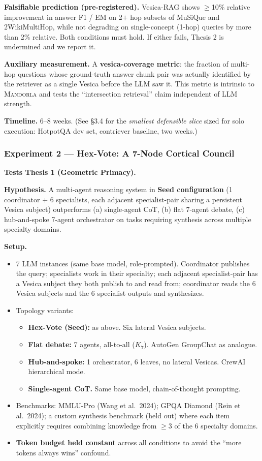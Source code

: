 \documentclass[11pt,a4paper]{article}
\begin{document}
\textbf{Falsifiable prediction (pre-registered).} Vesica-RAG shows $\geq$10\% relative improvement in answer F1 / EM on 2$+$ hop subsets of MuSiQue and 2WikiMultiHop, while not degrading on single-concept (1-hop) queries by more than 2\% relative. Both conditions must hold. If either fails, Thesis 2 is undermined and we report it.

\textbf{Auxiliary measurement.} A \textbf{vesica-coverage metric}: the fraction of multi-hop questions whose ground-truth answer chunk pair was actually identified by the retriever as a single Vesica before the LLM saw it. This metric is intrinsic to \textsc{Mandorla} and tests the ``intersection retrieval'' claim independent of LLM strength.

\textbf{Timeline.} 6--8 weeks. (See \S 3.4 for the \emph{smallest defensible slice} sized for solo execution: HotpotQA dev set, contriever baseline, two weeks.)

\subsubsection*{Experiment 2 --- Hex-Vote: A 7-Node Cortical Council}

\textbf{Tests Thesis 1 (Geometric Primacy).}

\textbf{Hypothesis.} A multi-agent reasoning system in \textbf{Seed configuration} (1 coordinator $+$ 6 specialists, each adjacent specialist-pair sharing a persistent Vesica subject) outperforms (a) single-agent CoT, (b) flat 7-agent debate, (c) hub-and-spoke 7-agent orchestrator on tasks requiring synthesis across multiple specialty domains.

\textbf{Setup.}

\begin{itemize}[leftmargin=*]
  \item 7 LLM instances (same base model, role-prompted). Coordinator publishes the query; specialists work in their specialty; each adjacent specialist-pair has a Vesica subject they both publish to and read from; coordinator reads the 6 Vesica subjects and the 6 specialist outputs and synthesizes.
  \item Topology variants:
  \begin{itemize}
    \item \textbf{Hex-Vote (Seed):} as above. Six lateral Vesica subjects.
    \item \textbf{Flat debate:} 7 agents, all-to-all ($K_7$). AutoGen GroupChat as analogue.
    \item \textbf{Hub-and-spoke:} 1 orchestrator, 6 leaves, no lateral Vesicas. CrewAI hierarchical mode.
    \item \textbf{Single-agent CoT.} Same base model, chain-of-thought prompting.
  \end{itemize}
  \item Benchmarks: MMLU-Pro (Wang et al.\ 2024); GPQA Diamond (Rein et al.\ 2024); a custom synthesis benchmark (held out) where each item explicitly requires combining knowledge from $\geq$3 of the 6 specialty domains.
  \item \textbf{Token budget held constant} across all conditions to avoid the ``more tokens always wins'' confound.
\end{itemize}
\end{document}
